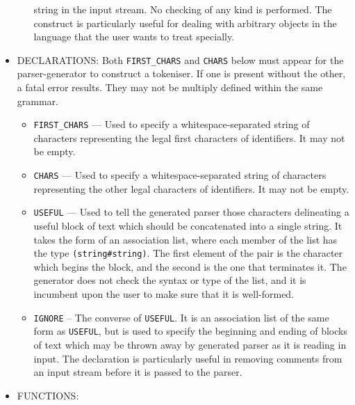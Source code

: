 \begin{itemize}
\begin{itemize}
         string in the input stream.  No checking of any kind is performed.
         The construct is particularly useful for dealing with arbitrary
         objects in the language that the user wants to treat specially.
     \end{itemize}
     \item {\small DECLARATIONS:} Both 
        \verb"FIRST_CHARS" and 
        \verb"CHARS"
        below must appear for the
        parser-generator to construct a tokeniser.  If one is present without
        the other, a fatal error results.  They may not be multiply
        defined within the same grammar.
     \begin{itemize}
     \item \verb"FIRST_CHARS"    \normalsize--- 
        Used to specify a whitespace-separated string of characters 
        representing
        the legal first characters of identifiers.  It may not be empty.
     \item \verb"CHARS"    \normalsize--- 
        Used to specify a whitespace-separated string of characters
        representing
        the other legal characters of identifiers.  It may not be empty.
     \item \verb"USEFUL" \normalsize---
        Used to tell the generated parser those characters delineating a useful
        block of text which should be concatenated into a single string.  It
        takes the form of an association list, where each member of the list
        has the type \verb"(string#string)".  The first element of the pair is
        the character which begins the block, and the second is the one that
        terminates it.  The generator does not check the
        syntax or type of the list, and it is incumbent upon the user to make
        sure that it is well-formed.
     \item \verb"IGNORE" \normalsize--
        The converse of \verb"USEFUL".  It is an association list of the
        same form as \verb"USEFUL", but is used to specify the 
        beginning
        and ending of blocks of text which may be thrown away by
        generated parser as it is reading in input.  The declaration is
        particularly useful in removing comments from an input stream before
        it is passed to the parser.
     \end{itemize} 
     \item {\small FUNCTIONS:} $\;$

\end{itemize}
